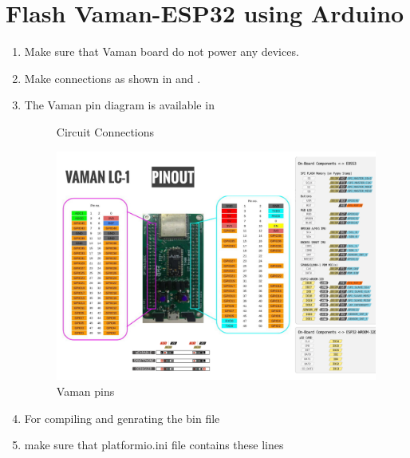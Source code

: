 \section{Flash Vaman-ESP32 using Arduino}

\renewcommand{\theequation}{\theenumi}
\renewcommand{\thefigure}{\theenumi}
\begin{enumerate}[label=\thesection.\arabic*.,ref=\thesection.\theenumi]
\item Make sure that Vaman board do not power any devices.  
\item Make connections as shown in  and  . 
\item The Vaman pin diagram is available in 
\begin{figure}[!h]
\centering

\caption{Circuit Connections}
\label{fig:vaman/uart/1}
\end{figure}
\begin{figure}
\centering
\includegraphics[width=\columnwidth]{./vaman/vaman-esp/lcd/figs/pin_sheet.png}
\caption{Vaman pins}
\label{fig:vaman-pin_sheet}
\end{figure}
\begin{table}[!ht]

\caption{}
\label{tab:arduino-uart}
\end{table}
\item For compiling and genrating the bin file 
\item make sure that platformio.ini file contains these lines

\end{enumerate}
